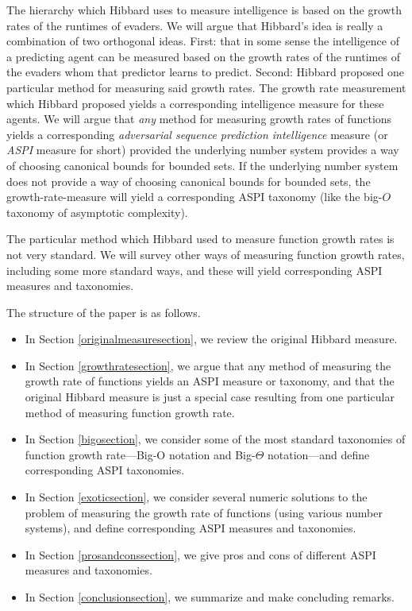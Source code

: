 \documentclass{article}
\begin{document}
The hierarchy which Hibbard uses to measure intelligence is based on the growth
rates of the runtimes of evaders.
We will argue that Hibbard's idea is really a combination of two
orthogonal ideas. First: that in some sense the intelligence of a predicting agent
can be measured based on the growth rates of the runtimes of the evaders whom that
predictor learns to predict. Second: Hibbard proposed one particular method for
measuring said growth rates. The growth rate measurement which Hibbard proposed yields
a corresponding intelligence measure for these agents. We will argue that \emph{any}
method for measuring growth rates of functions yields a corresponding
\emph{adversarial sequence prediction intelligence} measure (or \emph{ASPI} measure
for short) provided the underlying number system provides a way of choosing canonical bounds
for bounded sets. If the underlying number system does not provide a way of choosing
canonical bounds for bounded sets, the growth-rate-measure will yield a corresponding
ASPI taxonomy (like the big-$O$ taxonomy of asymptotic complexity).

The particular method which Hibbard used to measure function growth rates is
not very standard. We will survey other
ways of measuring function growth rates, including some more standard ways,
and these will yield corresponding ASPI measures and taxonomies.

The structure of the paper is as follows.
\begin{itemize}
    \item
    In Section \ref{originalmeasuresection}, we review the original Hibbard measure.
    \item
    In Section \ref{growthratesection}, we argue that any method of measuring
    the growth rate of functions yields an ASPI measure or taxonomy,
    and that the original Hibbard measure is just a special case resulting from
    one particular method of measuring function growth rate.
    \item
    In Section \ref{bigosection}, we consider some of the
    most standard taxonomies of
    function growth rate---Big-O notation and Big-$\Theta$ notation---and define
    corresponding ASPI taxonomies.
    \item
    In Section \ref{exoticsection}, we consider several numeric solutions to
    the problem of measuring the growth rate of functions (using various number
    systems), and define
    corresponding ASPI measures and taxonomies.
    \item
    In Section \ref{prosandconssection}, we give pros and cons of different
    ASPI measures and taxonomies.
    \item
    In Section \ref{conclusionsection}, we summarize and make concluding remarks.
\end{itemize}
\end{document}
